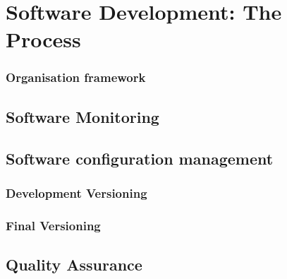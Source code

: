 \chapter{Software Development: The Process}
\subsection{Organisation framework}

\section{Software Monitoring}

\section{Software configuration management}
\subsection{Development Versioning}
\subsection{Final Versioning}

\section{Quality Assurance}
